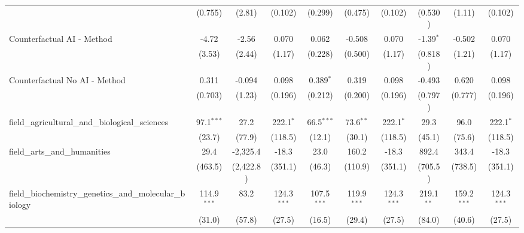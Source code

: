 \begin{tabular}{lccccccccc}
                                                               & (0.755)          & (2.81)          & (0.102)        & (0.299)       & (0.475)       & (0.102)        & (0.530)       & (1.11)        & (0.102)\\   
   Counterfactual AI - Method                                  & -4.72            & -2.56           & 0.070          & 0.062         & -0.508        & 0.070          & -1.39$^{*}$   & -0.502        & 0.070\\   
                                                               & (3.53)           & (2.44)          & (1.17)         & (0.228)       & (0.500)       & (1.17)         & (0.818)       & (1.21)        & (1.17)\\   
   Counterfactual No AI - Method                               & 0.311            & -0.094          & 0.098          & 0.389$^{*}$   & 0.319         & 0.098          & -0.493        & 0.620         & 0.098\\   
                                                               & (0.703)          & (1.23)          & (0.196)        & (0.212)       & (0.200)       & (0.196)        & (0.797)       & (0.777)       & (0.196)\\   
   field\_agricultural\_and\_biological\_sciences              & 97.1$^{***}$     & 27.2            & 222.1$^{*}$    & 66.5$^{***}$  & 73.6$^{**}$   & 222.1$^{*}$    & 29.3          & 96.0          & 222.1$^{*}$\\   
                                                               & (23.7)           & (77.9)          & (118.5)        & (12.1)        & (30.1)        & (118.5)        & (45.1)        & (75.6)        & (118.5)\\   
   field\_arts\_and\_humanities                                & 29.4             & -2,325.4        & -18.3          & 23.0          & 160.2         & -18.3          & 892.4         & 343.4         & -18.3\\   
                                                               & (463.5)          & (2,422.8)       & (351.1)        & (46.3)        & (110.9)       & (351.1)        & (705.5)       & (738.5)       & (351.1)\\   
   field\_biochemistry\_genetics\_and\_molecular\_biology      & 114.9$^{***}$    & 83.2            & 124.3$^{***}$  & 107.5$^{***}$ & 119.9$^{***}$ & 124.3$^{***}$  & 219.1$^{**}$  & 159.2$^{***}$ & 124.3$^{***}$\\   
                                                               & (31.0)           & (57.8)          & (27.5)         & (16.5)        & (29.4)        & (27.5)         & (84.0)        & (40.6)        & (27.5)\\   

\end{tabular}
